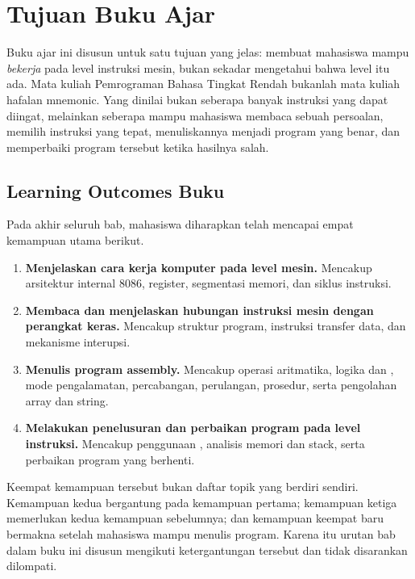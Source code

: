 \section{Tujuan Buku Ajar}
\label{sec:tujuan-buku}

Buku ajar ini disusun untuk satu tujuan yang jelas: membuat mahasiswa
mampu \emph{bekerja} pada level instruksi mesin, bukan sekadar
mengetahui bahwa level itu ada. Mata kuliah Pemrograman Bahasa
Tingkat Rendah bukanlah mata kuliah hafalan mnemonic. Yang dinilai
bukan seberapa banyak instruksi yang dapat diingat, melainkan
seberapa mampu mahasiswa membaca sebuah persoalan, memilih
instruksi yang tepat, menuliskannya menjadi program yang benar, dan
memperbaiki program tersebut ketika hasilnya salah.

\subsection{Learning Outcomes Buku}

Pada akhir seluruh bab, mahasiswa diharapkan telah mencapai empat
kemampuan utama berikut.

\begin{enumerate}
    \item \textbf{Menjelaskan cara kerja komputer pada level mesin.}
          Mencakup arsitektur internal 8086, register, segmentasi
          memori, dan siklus instruksi.

    \item \textbf{Membaca dan menjelaskan hubungan instruksi mesin
          dengan perangkat keras.} Mencakup struktur program,
          instruksi transfer data, dan mekanisme interupsi.

    \item \textbf{Menulis program assembly.} Mencakup operasi
          aritmatika, logika dan , mode pengalamatan,
          percabangan, perulangan, prosedur, serta pengolahan array
          dan string.

    \item \textbf{Melakukan penelusuran dan perbaikan program pada
          level instruksi.} Mencakup penggunaan ,
          analisis memori dan stack, serta perbaikan program yang
          berhenti.
\end{enumerate}

Keempat kemampuan tersebut bukan daftar topik yang berdiri sendiri.
Kemampuan kedua bergantung pada kemampuan pertama; kemampuan ketiga
memerlukan kedua kemampuan sebelumnya; dan kemampuan keempat baru
bermakna setelah mahasiswa mampu menulis program. Karena itu urutan
bab dalam buku ini disusun mengikuti ketergantungan tersebut dan
tidak disarankan dilompati.

